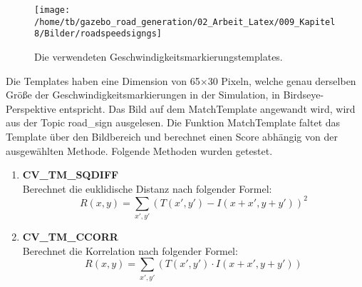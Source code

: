 \begin{figure}[H]
\begin{center}
  \texttt{[image: /home/tb/gazebo\_road\_generation/02\_Arbeit\_Latex/009\_Kapitel8/Bilder/roadspeedsigngs]}%
  \caption[Geschwindigkeitsmarkierungstemplates]%
           {\label{fig:Geschwindigkeitsmarkierungstemplates}%
           Die verwendeten Geschwindigkeitsmarkierungstemplates.
           }
\end{center}
\end{figure}

Die Templates haben eine Dimension von 65$\times$30 Pixeln, welche genau derselben Gr{\"o}{\ss}e der Geschwindigkeitsmarkierungen in der Simulation, in Birdseye-Perspektive entspricht. Das Bild auf dem MatchTemplate angewandt wird, wird aus der Topic road\_sign ausgelesen.
Die Funktion MatchTemplate faltet das Template {\"u}ber den Bildbereich und berechnet einen Score abh{\"a}ngig von der ausgew{\"a}hlten Methode. Folgende Methoden wurden getestet.

\begin{enumerate}

\item[] \textbf{CV\_TM\_SQDIFF}\hfill \\
Berechnet die euklidische Distanz nach folgender Formel:
$$R(x,y) = \sum_{x',y'} (T(x',y')-I(x+x',y+y'))^2$$ 

 


\item[] \textbf{CV\_TM\_CCORR}\hfill \\
Berechnet die Korrelation nach folgender Formel:
$$R(x,y) = \sum_{x',y'} (T(x',y') \cdot I(x+x',y+y'))$$ 
 

\end{enumerate}







